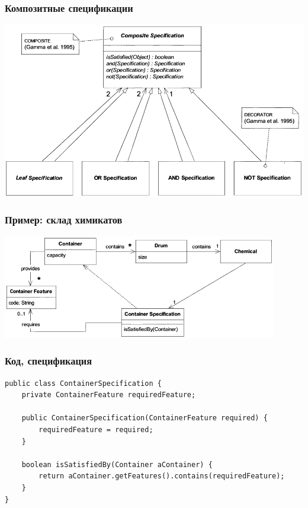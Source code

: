 \documentclass{../../slides-style}
\begin{document}
	\begin{frame}
		\frametitle{Композитные спецификации}
		\begin{center}
			\includegraphics[height=0.7\textheight]{compositeSpecifications.png}
		\end{center}
	\end{frame}

	\begin{frame}
		\frametitle{Пример: склад химикатов}
		\begin{center}
			\includegraphics[width=0.9\textwidth]{chemicalsStructure.png}
		\end{center}
	\end{frame}

	\begin{frame}[fragile]
		\frametitle{Код, спецификация}
		\begin{verbatim}
public class ContainerSpecification {
    private ContainerFeature requiredFeature;

    public ContainerSpecification(ContainerFeature required) {
        requiredFeature = required;
    }

    boolean isSatisfiedBy(Container aContainer) {
        return aContainer.getFeatures().contains(requiredFeature);
    }
}
		\end{verbatim}
\end{frame}
\end{document}
